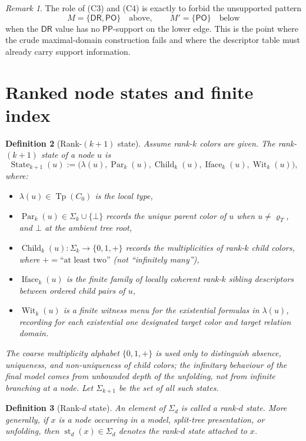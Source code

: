 \documentclass[11pt]{article}
\newtheorem{definition}{Definition}[section]
\theoremstyle{remark}
\newtheorem{remark}[definition]{Remark}
\newcommand{\DR}{\mathsf{DR}}
\newcommand{\PO}{\mathsf{PO}}
\newcommand{\PP}{\mathsf{PP}}
\newcommand{\Tp}{\operatorname{Tp}}
\newcommand{\State}{\operatorname{State}}
\newcommand{\Child}{\operatorname{Child}}
\newcommand{\Iface}{\operatorname{Iface}}
\newcommand{\Wit}{\operatorname{Wit}}
\newcommand{\Par}{\operatorname{Par}}
\newcommand{\st}{\operatorname{st}}
\begin{document}
\begin{remark}
The role of (C3) and (C4) is exactly to forbid the unsupported pattern
\[
M=\{\DR,\PO\}\quad\text{above},\qquad M'=\{\PO\}\quad\text{below}
\]
when the $\DR$ value has no $\PP$-support on the lower edge. This is the point where the crude maximal-domain construction fails and where the descriptor table must already carry support information.
\end{remark}

\section{Ranked node states and finite index}

\begin{definition}[Rank-$(k+1)$ state]\label{def:rank-k-plus-one-state}
Assume rank-$k$ colors are given. The rank-$(k+1)$ state of a node $u$ is
\[
\State_{k+1}(u):=\bigl(\lambda(u),\Par_k(u),\Child_k(u),\Iface_k(u),\Wit_k(u)\bigr),
\]
where:
\begin{itemize}
    \item $\lambda(u)\in\Tp(C_0)$ is the local type,
    \item $\Par_k(u)\in\Sigma_k\cup\{\bot\}$ records the unique parent color of $u$ when $u\neq \varrho_T$, and $\bot$ at the ambient tree root,
    \item $\Child_k(u):\Sigma_k\to\{0,1,+\}$ records the multiplicities of rank-$k$ child colors, where $+=\text{``at least two''}$ (not ``infinitely many''),
    \item $\Iface_k(u)$ is the finite family of locally coherent rank-$k$ sibling descriptors between ordered child pairs of $u$,
    \item $\Wit_k(u)$ is a finite witness menu for the existential formulas in $\lambda(u)$, recording for each existential one designated target color and target relation domain.
\end{itemize}
The coarse multiplicity alphabet $\{0,1,+\}$ is used only to distinguish absence, uniqueness, and non-uniqueness of child colors; the infinitary behaviour of the final model comes from unbounded depth of the unfolding, not from infinite branching at a node. Let $\Sigma_{k+1}$ be the set of all such states.
\end{definition}

\begin{definition}[Rank-$d$ state]
An element of $\Sigma_d$ is called a \emph{rank-$d$ state}. More generally, if $x$ is a node occurring in a model, split-tree presentation, or unfolding, then $\st_d(x)\in\Sigma_d$ denotes the rank-$d$ state attached to $x$.
\end{definition}
\end{document}
